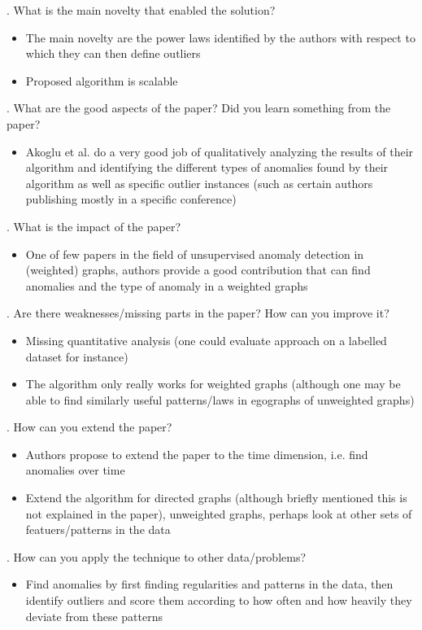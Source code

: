 \documentclass[12pt]{article}
\begin{document}
. What is the main novelty that enabled the solution?

\begin{itemize}
    \item The main novelty are the power laws identified by the authors with respect to which they can then define outliers
    \item Proposed algorithm is scalable 
\end{itemize}

. What are the good aspects of the paper? Did you learn something from the paper?

\begin{itemize}
    \item Akoglu et al. do a very good job of qualitatively analyzing the results of their algorithm and identifying the different types of anomalies found by their algorithm as well as specific outlier instances (such as certain authors publishing mostly in a specific conference)
\end{itemize}

. What is the impact of the paper?

\begin{itemize}
    \item One of few papers in the field of unsupervised anomaly detection in (weighted) graphs, authors provide a good contribution that can find anomalies and the type of anomaly in a weighted graphs
\end{itemize}

. Are there weaknesses/missing parts in the paper? How can you improve it?

\begin{itemize}
    \item Missing quantitative analysis (one could evaluate approach on a labelled dataset for instance)
    \item The algorithm only really works for weighted graphs (although one may be able to find similarly useful patterns/laws in egographs of unweighted graphs)
\end{itemize}

. How can you extend the paper?

\begin{itemize}
    \item Authors propose to extend the paper to the time dimension, i.e. find anomalies over time
    \item Extend the algorithm for directed graphs (although briefly mentioned this is not explained in the paper), unweighted graphs, perhaps look at other sets of featuers/patterns in the data
\end{itemize}

. How can you apply the technique to other data/problems?

\begin{itemize}
    \item Find anomalies by first finding regularities and patterns in the data, then identify outliers and score them according to how often and how heavily they deviate from these patterns
\end{itemize}
\end{document}
